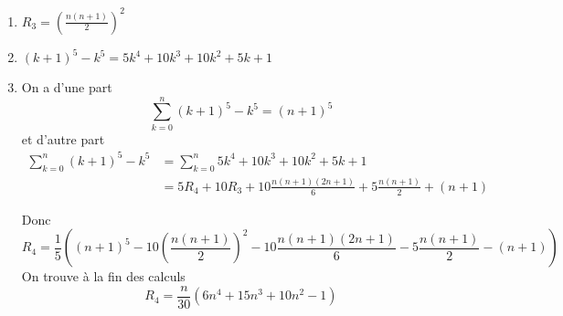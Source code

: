 \documentclass[a4paper, 11pt,reqno]{article}
\begin{document}
\begin{correction}
\begin{enumerate}
\item $R_3 =\left(\frac{n(n+1)}{2}\right)^2$
\item $(k+1)^5-k^5 = 5k^4 +10k^3+10k^2 +5k +1 $
\item On a d'une part 
$$\sum_{k=0}^n(k+1)^5 -k^5 = (n+1)^5$$
et d'autre part 
\begin{align*}
\sum_{k=0}^n(k+1)^5 -k^5  &=\sum_{k=0}^n 5k^4 +10k^3+10k^2 +5k +1 \\
											&= 5 R_4  +10 R_3 +10 \frac{n(n+1)(2n+1)}{6} +5 \frac{n(n+1)}{2}+ (n+1)
\end{align*}

Donc 
$$R_4 =\frac{1}{5} \left( (n+1)^5- 10\left(\frac{n(n+1)}{2}\right)^2 -10  \frac{n(n+1)(2n+1)}{6}  - 5 \frac{n(n+1)}{2}-(n+1) \right)$$
On trouve à la fin des calculs 
$$R_4 = \frac{n}{30} (6n^4+15n^3 +10n^2-1)$$


\end{enumerate}
\end{correction}
\end{document}
